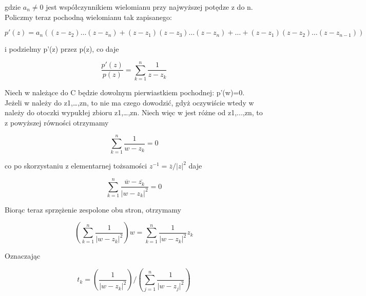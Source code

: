 \documentclass{article}
\begin{document}
gdzie \(a_{n}\neq 0\) jest współczynnikiem wielomianu przy najwyższej potędze z do n. Policzmy teraz pochodną wielomianu tak zapisanego: 

\begin{equation*}
	p'(z)=a_{n}((z-z_{2})\ldots (z-z_{n})+(z-z_{1})(z-z_{3})\ldots (z-z_{n})+\ldots +(z-z_{1})(z-z_{2})\ldots (z-z_{n-1}))
\end{equation*}

i podzielmy p'(z) przez p(z), co daje

\[{\frac {p'(z)}{p(z)}}=\sum _{k=1}^{n}{\frac {1}{z-z_{k}}}\]

Niech w należące do C będzie dowolnym pierwiastkiem pochodnej: p'(w)=0. Jeżeli w należy do {z1,…,zn}, to nie ma czego dowodzić, gdyż oczywiście wtedy w należy do otoczki wypukłej zbioru {z1,…,zn}. Niech więc w jest różne od {z1,...,zn}, to z powyższej równości otrzymamy 


\begin{equation}
	\sum _{k=1}^{n}{\frac {1}{w-z_{k}}}=0
\end{equation}

co po skorzystaniu z elementarnej tożsamości \(z^{-1}={\overline {z}}/|z|^{2}\) daje

\begin{displaymath}
	\sum _{k=1}^{n}{\frac {{\overline {w}}-{\overline {z_{k}}}}{\vert w-z_{k}\vert ^{2}}}=0
\end{displaymath}

Biorąc teraz sprzężenie zespolone obu stron, otrzymamy 

\begin{equation*}
	\left(\sum _{k=1}^{n}{\frac {1}{\vert w-z_{k}\vert ^{2}}}\right)w=\sum _{k=1}^{n}{\frac {1}{\vert w-z_{k}\vert ^{2}}}z_{k}
\end{equation*}

Oznaczając

\begin{equation}
	t_{k}=\left({\frac {1}{\vert w-z_{k}\vert ^{2}}}\right)/\left(\sum _{j=1}^{n}{\frac {1}{\vert w-z_{j}\vert ^{2}}}\right)
\end{equation}
\end{document}
